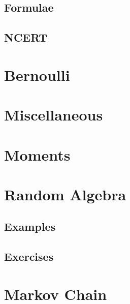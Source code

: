 \documentclass[journal]{IEEEtran}
\begin{document}
\subsection{Formulae}
\subsection{NCERT}


\section{Bernoulli}


    \section{Miscellaneous}

\iffalse
\section{Moments}

\section{Random Algebra}
\subsection{Examples}

\subsection{Exercises}

\section{Markov Chain}

\end{document}
